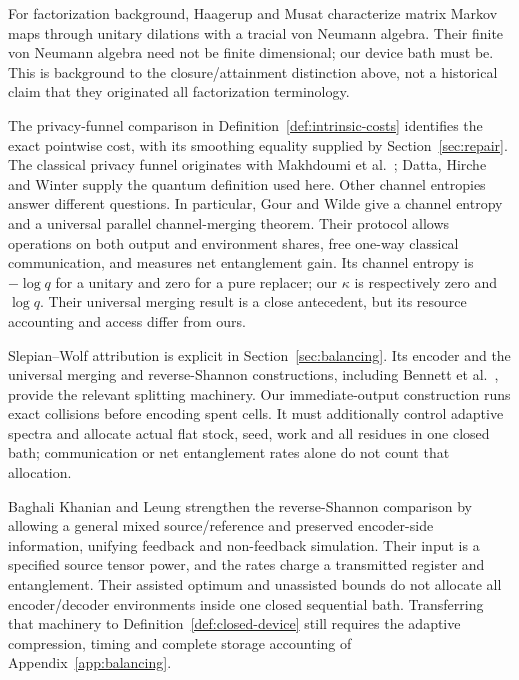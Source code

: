 \documentclass[11pt,a4paper]{article}
\numberwithin{equation}{section}
\theoremstyle{plain}
\theoremstyle{definition}
\begin{document}
For factorization background, Haagerup and Musat
\cite[Definition 1.3 and Theorem 2.2]{HaagerupMusat2011} characterize matrix
Markov maps through unitary dilations with a tracial von Neumann algebra.
Their finite von Neumann algebra need not be finite dimensional; our device
bath must be. This is background to the closure/attainment distinction above,
not a historical claim that they originated all factorization terminology.

The privacy-funnel comparison in Definition~\ref{def:intrinsic-costs}
identifies the exact pointwise cost, with its smoothing equality supplied by
Section~\ref{sec:repair}. The classical privacy funnel originates with
Makhdoumi et al.\ \cite{Makhdoumi2014}; Datta, Hirche and Winter supply the
quantum definition used here. Other channel entropies answer different questions.
In particular, Gour and Wilde
\cite[Proposition 6, Theorem 10 and Proposition 24]{GourWilde2021} give a
channel entropy and a universal parallel channel-merging theorem. Their
protocol allows operations on both output and environment shares, free one-way
classical communication, and measures net entanglement gain. Its channel
entropy is $-\log q$ for a unitary and zero for a pure replacer; our $\kappa$
is respectively zero and $\log q$. Their universal merging result is a close
antecedent, but its resource accounting and access differ from ours.

Slepian--Wolf attribution is explicit in Section~\ref{sec:balancing}. Its
encoder and the universal merging and reverse-Shannon constructions, including Bennett et al.\ \cite[Theorem 3]{Bennett2014}, provide the relevant splitting machinery. Our
immediate-output construction runs exact collisions before encoding spent
cells. It must additionally control adaptive spectra and allocate actual flat
stock, seed, work and all residues in one closed bath; communication or net
entanglement rates alone do not count that allocation.

Baghali Khanian and Leung \cite[section II, Definition 3 and Theorems 6 and 8]{KhanianLeung2025}
strengthen the reverse-Shannon comparison by allowing a general mixed
source/reference and preserved encoder-side information, unifying feedback
and non-feedback simulation. Their input is a specified source tensor power,
and the rates charge a transmitted register and entanglement. Their assisted
optimum and unassisted bounds do not allocate all encoder/decoder environments
inside one closed sequential bath. Transferring that machinery to
Definition~\ref{def:closed-device} still requires the adaptive compression,
timing and complete storage accounting of Appendix~\ref{app:balancing}.
\end{document}
